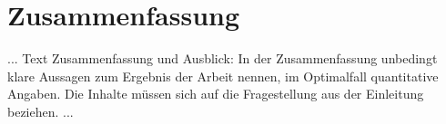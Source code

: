 \chapter{Zusammenfassung}
\label{cha:zusammenfassung}

... Text Zusammenfassung und Ausblick: In der Zusammenfassung unbedingt klare Aussagen zum Ergebnis der Arbeit nennen, im Optimalfall quantitative Angaben. Die Inhalte müssen sich auf die Fragestellung aus der Einleitung  beziehen. ...

